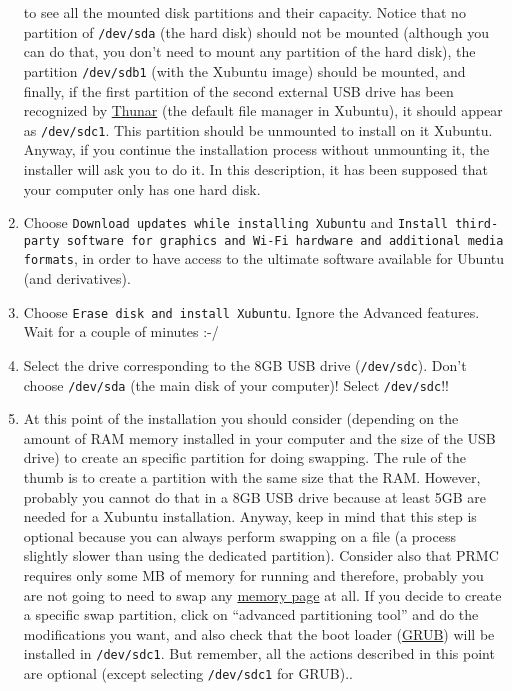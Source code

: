\begin{enumerate}
  to see all the mounted disk partitions and their capacity. Notice
  that no partition of \texttt{/dev/sda} (the hard disk) should not be
  mounted (although you can do that, you don't need to mount any
  partition of the hard disk), the partition \texttt{/dev/sdb1} (with
  the Xubuntu image) should be mounted, and finally, if the first
  partition of the second external USB drive has been recognized by
  \href{https://gitlab.xfce.org/xfce/thunar}{Thunar} (the default file
  manager in Xubuntu), it should appear as \texttt{/dev/sdc1}. This
  partition should be unmounted to install on it Xubuntu. Anyway, if
  you continue the installation process without unmounting it, the
  installer will ask you to do it. In this description, it has been
  supposed that your computer only has one hard disk.

\item Choose \texttt{Download updates while installing Xubuntu} and
  \texttt{Install third-party software for graphics and Wi-Fi hardware
    and additional media formats}, in order to have access to the
    ultimate software available for Ubuntu (and derivatives).

\item Choose \texttt{Erase disk and install Xubuntu}. Ignore the
  Advanced features. Wait for a couple of minutes :-/

\item Select the drive corresponding to the 8GB USB drive
  (\texttt{/dev/sdc}). Don't choose \texttt{/dev/sda} (the main disk of
  your computer)! Select \texttt{/dev/sdc}!!

\item At this point of the installation you should consider (depending
  on the amount of RAM memory installed in your computer and the size
  of the USB drive) to create an specific partition for doing
  swapping. The rule of the thumb is to create a partition with the
  same size that the RAM. However, probably you cannot do that in a
  8GB USB drive because at least 5GB are needed for a Xubuntu
  installation. Anyway, keep in mind that this step is optional
  because you can always perform swapping on a file (a process
  slightly slower than using the dedicated partition). Consider also
  that PRMC requires only some MB of memory for running and
  therefore, probably you are not going to need to swap any
  \href{https://en.wikipedia.org/wiki/Page_(computer_memory)}{memory
    page} at all. If you decide to create a specific swap partition,
  click on ``advanced partitioning tool'' and do the modifications you
  want, and also check that the boot loader
  (\href{https://www.gnu.org/software/grub/}{GRUB}) will be installed
  in \texttt{/dev/sdc1}. But remember, all the actions described in
  this point are optional (except selecting \texttt{/dev/sdc1} for
  GRUB)..


\end{enumerate}
